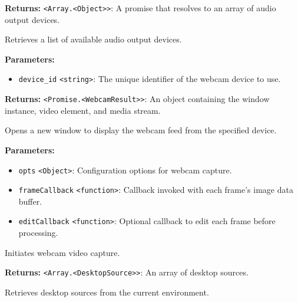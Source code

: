 \documentclass[12pt,a4paper]{article}
\begin{document}
\noindent \textbf{Returns:} \texttt{<Array.<Object>>}: A promise that resolves to an array of audio output devices.

\noindent Retrieves a list of available audio output devices.

\vspace{5mm}
\noindent {}


\noindent \textbf{Parameters:}
\begin{itemize}
  \item \texttt{device\_id} \texttt{<string>}: The unique identifier of the webcam device to use.
\end{itemize}

\noindent \textbf{Returns:} \texttt{<Promise.<WebcamResult>>}: An object containing the window instance, video element, and media stream.

\noindent Opens a new window to display the webcam feed from the specified device.

\vspace{5mm}
\noindent {}


\noindent \textbf{Parameters:}
\begin{itemize}
  \item \texttt{opts} \texttt{<Object>}: Configuration options for webcam capture.
  \item \texttt{frameCallback} \texttt{<function>}: Callback invoked with each frame's image data buffer.
  \item \texttt{editCallback} \texttt{<function>}: Optional callback to edit each frame before processing.
\end{itemize}

\noindent Initiates webcam video capture.

\vspace{5mm}
\noindent {}


\noindent \textbf{Returns:} \texttt{<Array.<DesktopSource>>}: An array of desktop sources.

\noindent Retrieves desktop sources from the current environment.
\end{document}
